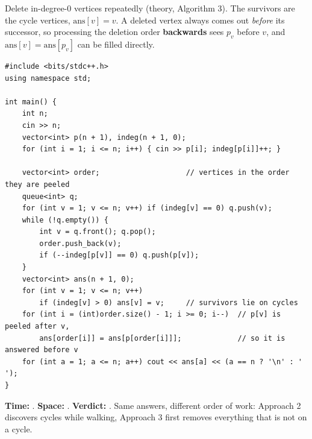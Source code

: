 \begin{alternativebox}
Delete in-degree-0 vertices repeatedly (theory, Algorithm 3). The survivors are the cycle vertices, $\text{ans}[v] = v$. A deleted vertex always comes out \emph{before} its successor, so processing the deletion order \textbf{backwards} sees $p_v$ before $v$, and $\text{ans}[v] = \text{ans}[p_v]$ can be filled directly.

\begin{lstlisting}[style=cpp]
#include <bits/stdc++.h>
using namespace std;

int main() {
    int n;
    cin >> n;
    vector<int> p(n + 1), indeg(n + 1, 0);
    for (int i = 1; i <= n; i++) { cin >> p[i]; indeg[p[i]]++; }

    vector<int> order;                    // vertices in the order they are peeled
    queue<int> q;
    for (int v = 1; v <= n; v++) if (indeg[v] == 0) q.push(v);
    while (!q.empty()) {
        int v = q.front(); q.pop();
        order.push_back(v);
        if (--indeg[p[v]] == 0) q.push(p[v]);
    }
    vector<int> ans(n + 1, 0);
    for (int v = 1; v <= n; v++)
        if (indeg[v] > 0) ans[v] = v;     // survivors lie on cycles
    for (int i = (int)order.size() - 1; i >= 0; i--)  // p[v] is peeled after v,
        ans[order[i]] = ans[p[order[i]]];             // so it is answered before v
    for (int a = 1; a <= n; a++) cout << ans[a] << (a == n ? '\n' : ' ');
}
\end{lstlisting}

\begin{diagrambox}
\end{diagrambox}

\begin{complexitybox}
\textbf{Time:} . \textbf{Space:} . \textbf{Verdict:} \ac{}. Same answers, different order of work: Approach 2 discovers cycles while walking, Approach 3 first removes everything that is not on a cycle.
\end{complexitybox}
\end{alternativebox}

